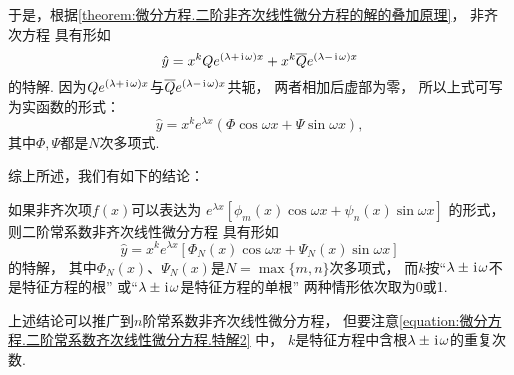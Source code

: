 于是，根据\cref{theorem:微分方程.二阶非齐次线性微分方程的解的叠加原理}，
非齐次方程  具有形如\begin{equation*}
\hat{y} = x^k Q e^{(\lambda+\kern1pt\mathrm{i}\kern1pt\omega)x} + x^k \overline{Q} e^{(\lambda-\kern1pt\mathrm{i}\kern1pt\omega)x}
\end{equation*}的特解.
因为\(Q e^{(\lambda+\kern1pt\mathrm{i}\kern1pt\omega)x}\)与\(\overline{Q} e^{(\lambda-\kern1pt\mathrm{i}\kern1pt\omega)x}\)共轭，
两者相加后虚部为零，
所以上式可写为实函数的形式：
\begin{equation}
\hat{y} = x^k e^{\lambda x} (\Phi \cos\omega x + \Psi \sin\omega x),
\end{equation}
其中\(\Phi,\Psi\)都是\(N\)次多项式.

综上所述，我们有如下的结论：

如果非齐次项\(f(x)\)可以表达为
\(e^{\lambda x} [\phi_m(x) \cos\omega x + \psi_n(x) \sin\omega x]\)
的形式，
则二阶常系数非齐次线性微分方程
具有形如
\begin{equation}\label{equation:微分方程.二阶常系数齐次线性微分方程.特解2}
\hat{y} = x^k e^{\lambda x} [\Phi_N(x) \cos\omega x + \Psi_N(x) \sin\omega x]
\end{equation}
的特解，
其中\(\Phi_N(x)\)、\(\Psi_N(x)\)是\(N=\max\{m,n\}\)次多项式，
而\(k\)按“\(\lambda\pm\kern1pt\mathrm{i}\kern1pt\omega\)不是特征方程的根”%
或“\(\lambda\pm\kern1pt\mathrm{i}\kern1pt\omega\)是特征方程的单根”%
两种情形依次取为0或1.

上述结论可以推广到\(n\)阶常系数非齐次线性微分方程，
但要注意\cref{equation:微分方程.二阶常系数齐次线性微分方程.特解2} 中，
\(k\)是特征方程中含根\(\lambda\pm\kern1pt\mathrm{i}\kern1pt\omega\)的重复次数.

